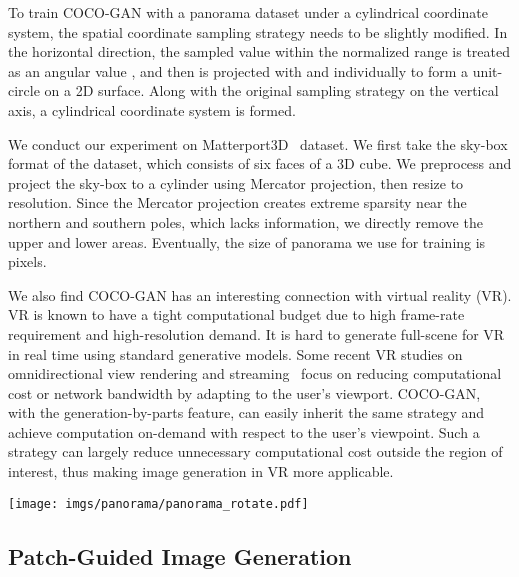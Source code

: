 \documentclass{article}
\newcommand{\modelName}{COCO-GAN }
\newcommand{\modelNamePunc}{COCO-GAN}
\begin{document}
        To train \modelName with a panorama dataset under a cylindrical coordinate system, the spatial coordinate sampling strategy needs to be slightly modified. In the horizontal direction, the sampled value within the normalized range  is treated as an angular value , and then is projected with  and  individually to form a unit-circle on a 2D surface. Along with the original sampling strategy on the vertical axis, a cylindrical coordinate system is formed. 
        
        We conduct our experiment on Matterport3D~\cite{matterport3d} dataset. We first take the sky-box format of the dataset, which consists of six faces of a 3D cube. We preprocess and project the sky-box to a cylinder using Mercator projection, then resize to  resolution. Since the Mercator projection creates extreme sparsity near the northern and southern poles, which lacks information, we directly remove the upper and lower  areas. Eventually, the size of panorama we use for training is  pixels.

        We also find \modelName has an interesting connection with virtual reality (VR). VR is known to have a tight computational budget due to high frame-rate requirement and high-resolution demand. It is hard to generate full-scene for VR in real time using standard generative models. Some recent VR studies on omnidirectional view rendering and streaming~\cite{vr-streaming-1,vr-streaming-2,vr-streaming-3} focus on reducing computational cost or network bandwidth by adapting to the user's viewport. \modelNamePunc, with the generation-by-parts feature, can easily inherit the same strategy and achieve computation on-demand with respect to the user's viewpoint. Such a strategy can largely reduce unnecessary computational cost outside the region of interest, thus making image generation in VR more applicable.
        
        \begin{figure*}[t]
            \texttt{[image: imgs/panorama/panorama\_rotate.pdf]}
            \caption{The generated panorama is cyclic in the horizontal direction since \modelName is trained with a cylindrical coordinate system. Here, we paste the same generated panorama twice (from  to ) to better illustrate the cyclic property of the generated panorama. More generation results are provided in Appendix~\ref{appendix:panorama-samples}.}
            \label{fig:cyclic-panorama}
\end{figure*}
        
    \subsection{Patch-Guided Image Generation}
        
\end{document}
